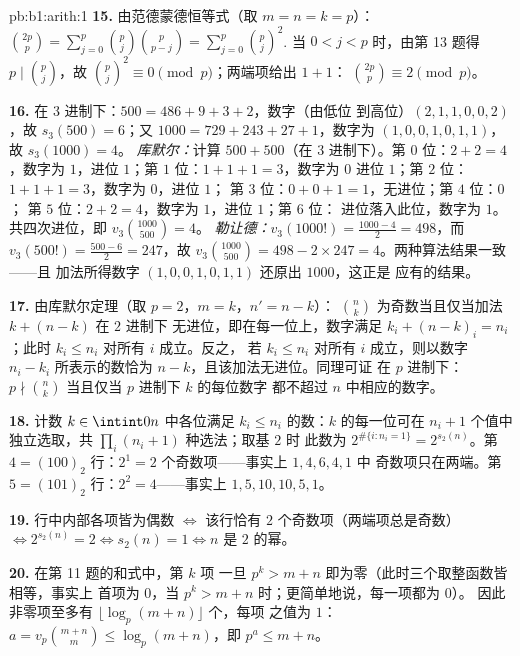 \begin{solution}{pb:b1:arith:1}
\textbf{15.} 由范德蒙德恒等式（取 $m = n = k = p$）：$\binom{2p}p =
\sum_{j=0}^p \binom pj\binom p{p-j} = \sum_{j=0}^p \binom pj^2$.
当 $0 < j < p$ 时，由第 13 题得 $p \mid \binom pj$，故 $\binom
pj^2 \equiv 0 \pmod p$；两端项给出 $1 + 1$：
$\binom{2p}p \equiv 2 \pmod p$。

\textbf{16.} 在 $3$ 进制下：$500 = 486 + 9 + 3 + 2$，数字（由低位
到高位）$(2, 1, 1, 0, 0, 2)$，故 $s_3(500) = 6$；又 $1000 = 729 +
243 + 27 + 1$，数字为 $(1, 0, 0, 1, 0, 1, 1)$，故 $s_3(1000) = 4$。
\emph{库默尔：}计算 $500 + 500$（在 $3$ 进制下）。第 $0$ 位：$2 + 2 =
4$，数字为 $1$，进位 $1$；第 $1$ 位：$1 + 1 + 1 = 3$，数字为 $0$
进位 $1$；第 $2$ 位：$1 + 1 + 1 = 3$，数字为 $0$，进位 $1$；
第 $3$ 位：$0 + 0 + 1 = 1$，无进位；第 $4$ 位：$0$；
第 $5$ 位：$2 + 2 = 4$，数字为 $1$，进位 $1$；第 $6$ 位：
进位落入此位，数字为 $1$。共四次进位，即 $v_3\binom{1000}{500} = 4$。
\emph{勒让德：}$v_3(1000!) = \frac{1000 - 4}2 = 498$，而
$v_3(500!) = \frac{500 - 6}2 = 247$，故 $v_3\binom{1000}{500} =
498 - 2\times247 = 4$。两种算法结果一致——且
加法所得数字 $(1, 0, 0, 1, 0, 1, 1)$ 还原出 $1000$，这正是
应有的结果。

\textbf{17.} 由库默尔定理（取 $p = 2$，$m = k$，$n' = n - k$）：
$\binom nk$ 为奇数当且仅当加法 $k + (n - k)$ 在 $2$ 进制下
无进位，即在每一位上，数字满足 $k_i + (n -
k)_i = n_i$；此时 $k_i \leq n_i$ 对所有 $i$ 成立。反之，
若 $k_i \leq n_i$ 对所有 $i$ 成立，则以数字 $n_i -
k_i$ 所表示的数恰为 $n - k$，且该加法无进位。同理可证
在 $p$ 进制下：$p \nmid \binom nk$ 当且仅当 $p$ 进制下 $k$ 的每位数字
都不超过 $n$ 中相应的数字。

\textbf{18.} 计数 $k \in \intint0n$ 中各位满足
$k_i \leq n_i$ 的数：$k$ 的每一位可在
$n_i + 1$ 个值中独立选取，共 $\prod_i (n_i + 1)$ 种选法；取基 $2$ 时
此数为 $2^{\#\{i : n_i = 1\}} = 2^{s_2(n)}$。第 $4 =
(100)_2$ 行：$2^1 = 2$ 个奇数项——事实上 $1, 4, 6, 4, 1$ 中
奇数项只在两端。第 $5 = (101)_2$ 行：$2^2 = 4$——事实上
$1, 5, 10, 10, 5, 1$。

\textbf{19.} 行中内部各项皆为偶数 $\iff$ 该行恰有
$2$ 个奇数项（两端项总是奇数）$\iff 2^{s_2(n)} =
2 \iff s_2(n) = 1 \iff n$ 是 $2$ 的幂。

\textbf{20.} 在第 11 题的和式中，第 $k$ 项
一旦 $p^k > m + n$ 即为零（此时三个取整函数皆相等，事实上
首项为 $0$，当 $p^k > m+n$ 时；更简单地说，每一项都为 $0$）。
因此非零项至多有 $\lfloor \log_p(m+n)\rfloor$ 个，每项
之值为 $1$：$a = v_p\binom{m+n}m \leq \log_p(m+n)$，即 $p^a \leq
m + n$。


\end{solution}
